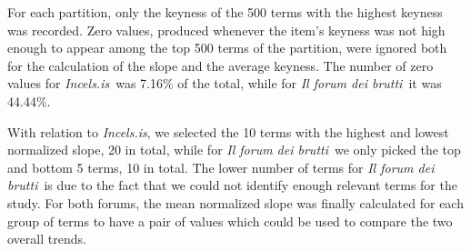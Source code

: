 \documentclass[11pt]{article}
\newcommand{\paolo}[1]{{\color{red} #1}}
\newcommand{\todoA}[1]{\todo[color=blue!40]{A: #1}}
\newcommand{\dsENcorpus}{IFU-22-EN}
\newcommand{\enforum}{\textit{Incels.is}}
\newcommand{\itforum}{\textit{Il forum dei brutti}}
\begin{document}
For each partition, only the keyness of the 500 terms with the highest keyness was recorded. Zero values, produced whenever the item's keyness was not high enough to appear among the top 500 terms of the partition, were ignored both for the calculation of the slope and the average keyness. The number of zero values for \enforum\, was 7.16\% of the total, while for \itforum\, it was 44.44\%.

With relation to \enforum, we selected the 10 terms with the highest and lowest normalized slope, 20 in total, while for \itforum\, we only picked the top and bottom 5 terms, 10 in total. The lower number of terms for \itforum\, is due to the fact that we could not identify enough relevant terms for the study. For both forums, the mean normalized slope was finally calculated for each group of terms to have a pair of values which could be used to compare the two overall trends.


\end{document}
